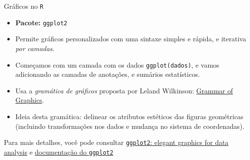 \documentclass[
  10pt,
  ignorenonframetext,
]{beamer}
\providecommand{\tightlist}{%
  \setlength{\itemsep}{0pt}\setlength{\parskip}{0pt}}
\begin{document}
\begin{frame}[fragile]{Gráficos no \texttt{R}}
\protect\hypertarget{gruxe1ficos-no-r}{}
\begin{itemize}
\tightlist
\item
  \textbf{Pacote:} \texttt{ggplot2}
\item
  Permite gráficos personalizados com uma sintaxe simples e rápida, e
  iterativa \emph{por camadas}.
\item
  Começamos com um camada com os dados \texttt{ggplot(dados)}, e vamos
  adicionando as camadas de anotações, e sumários estatísticos.
\item
  Usa a \emph{gramática de gráficos} proposta por Leland Wilkinson:
  \href{https://www.springer.com/gp/book/9780387245447}{Grammar of
  Graphics}.
\item
  Ideia desta gramática: delinear os atributos estéticos das figuras
  geométricas (incluindo transformações nos dados e mudança no sistema
  de coordenadas).
\end{itemize}

Para mais detalhes, você pode consultar
\href{https://ggplot2-book.org}{\texttt{ggplot2}: elegant graphics for
data analysis} e \href{https://ggplot2.tidyverse.org}{documentação do
\texttt{ggplot2}}
\end{frame}
\end{document}
